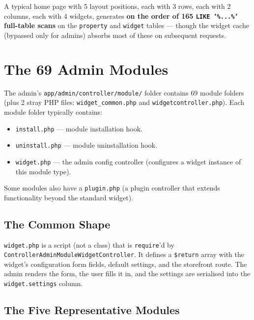 \documentclass[11pt,a4paper]{article}
\begin{document}
A typical home page with 5 layout positions, each with 3 rows,
each with 2 columns, each with 4 widgets, generates
\textbf{on the order of 165 \texttt{LIKE '\%...\%'} full-table scans}
on the \texttt{property} and \texttt{widget} tables --- though
the widget cache (bypassed only for admins) absorbs most of
these on subsequent requests.

\section{The 69 Admin Modules}\label{sec:modules}

The admin's \texttt{app/admin/controller/module/} folder contains
69 module folders (plus 2 stray PHP files:
\texttt{widget\_common.php} and \texttt{widgetcontroller.php}).
Each module folder typically contains:

\begin{itemize}[leftmargin=1.6em,itemsep=2pt]
  \item \texttt{install.php} --- module installation hook.
  \item \texttt{uninstall.php} --- module uninstallation hook.
  \item \texttt{widget.php} --- the admin config controller
        (configures a widget instance of this module type).
\end{itemize}

Some modules also have a \texttt{plugin.php} (a plugin controller
that extends functionality beyond the standard widget).

\subsection{The Common Shape}

\texttt{widget.php} is a script (not a class) that is
\texttt{require}'d by \texttt{ControllerAdminModuleWidgetController}.
It defines a \texttt{\$return} array with the widget's
configuration form fields, default settings, and the storefront
route. The admin renders the form, the user fills it in, and the
settings are serialised into the \texttt{widget.settings} column.

\subsection{The Five Representative Modules}
\end{document}
